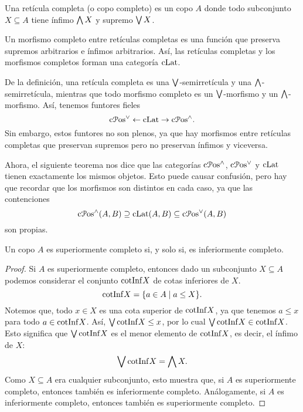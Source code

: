 \begin{definition}
  Una retícula completa (o copo completo) es un copo $A$
  donde todo subconjunto $X\subseteq A$ tiene ínfimo $\bigwedge X$ y
  supremo $\bigvee X$.

  Un morfismo completo entre retículas completas es una función que
  preserva supremos arbitrarios e ínfimos arbitrarios.
  Así, las retículas completas y los morfismos completos forman una
  categoría $\mathrm{cLat}$.
\end{definition}
De la definición, una retícula completa es una
$\bigvee$-semirretícula y una $\bigwedge$-semirretícula, mientras que todo
morfismo completo es un $\bigvee$-morfismo y un $\bigwedge$-morfismo.
Así, tenemos funtores fieles
\begin{equation}
  \mathrm{c}\mathcal{P}\mathrm{os}^\vee \leftarrow \mathrm{cLat} \to \mathrm{c}\mathcal{P}\mathrm{os}^\wedge.
\end{equation}
Sin embargo, estos funtores no son plenos, ya que hay morfismos entre
retículas completas que preservan supremos pero no preservan ínfimos y
viceversa.

Ahora, el siguiente teorema nos dice que las categorías $\mathrm{c}\mathcal{P}\mathrm{os}^\wedge$,
$\mathrm{c}\mathcal{P}\mathrm{os}^\vee$ y $\mathrm{cLat}$ tienen exactamente los mismos objetos.
Esto puede causar confusión, pero hay que recordar que los morfismos
son distintos en cada caso, ya que las contenciones
\[
  \mathrm{c}\mathcal{P}\mathrm{os}^\wedge(A,B)\supseteq \mathrm{cLat}(A,B)\subseteq\mathrm{c}\mathcal{P}\mathrm{os}^\vee(A,B)
\]
son propias.
\begin{proposition}
  Un copo $A$ es superiormente completo si, y solo si, es
  inferiormente completo.
\end{proposition}
\begin{proof}
  Si $A$ es superiormente completo, entonces
  dado un subconjunto $X\subseteq A$ podemos considerar el conjunto
  $\mathrm{cotInf} X$ de cotas inferiores de $X$.
  \[
    \mathrm{cotInf} X = \{a\in A \mid a\leq X\}
  .\]
  Notemos que, todo $x\in X$ es una cota superior de $\mathrm{cotInf} X$,
  ya que tenemos $a\leq x$ para todo $a\in\mathrm{cotInf} X$.
  Así, $\bigvee\mathrm{cotInf} X\leq x$, por lo cual
  $\bigvee\mathrm{cotInf} X\in\mathrm{cotInf} X$.
  Esto significa que $\bigvee\mathrm{cotInf} X$ es el menor elemento de $\mathrm{cotInf}
  X$, es decir, el ínfimo de $X$:
  \[
    \bigvee\mathrm{cotInf} X = \bigwedge X
  .\]
  Como $X\subseteq A$ era cualquier subconjunto,
  esto muestra que, si $A$ es superiormente completo, entonces
  también es inferiormente completo.
  Análogamente, si $A$ es inferiormente completo, entonces también
  es superiormente completo.
\end{proof}



